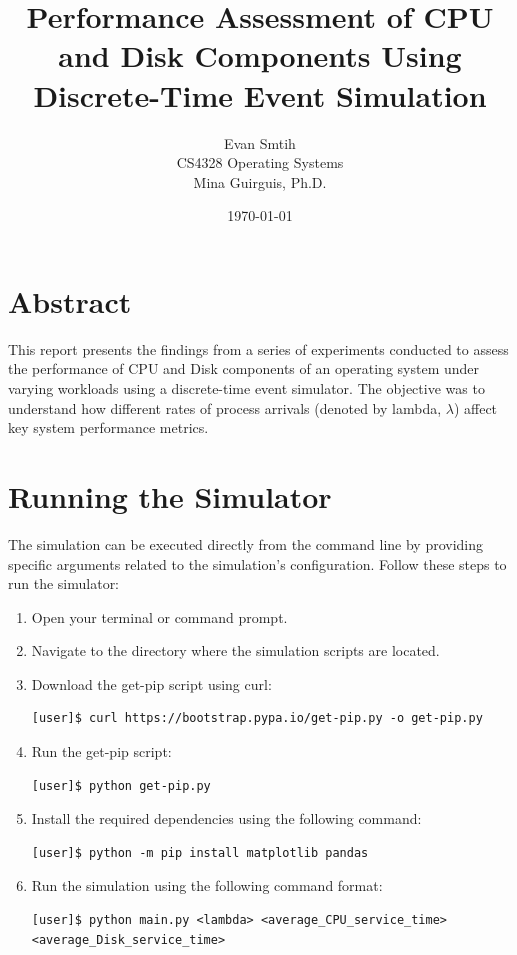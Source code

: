 \documentclass[12pt]{article}
\title{Performance Assessment of CPU and Disk Components Using Discrete-Time Event Simulation}
\author{Evan Smtih\\
        CS4328 Operating Systems\\
        Mina Guirguis, Ph.D.\\}
\date{\today}
\begin{document}
\maketitle

\section{Abstract}
This report presents the findings from a series of experiments conducted to assess the performance of CPU and Disk components of an operating system under varying workloads using a discrete-time event simulator. The objective was to understand how different rates of process arrivals (denoted by lambda, $\lambda$) affect key system performance metrics.

\section{Running the Simulator}
The simulation can be executed directly from the command line by providing specific arguments related to the simulation's configuration. Follow these steps to run the simulator:

\begin{enumerate}
    \small\item Open your terminal or command prompt.
    \small\item Navigate to the directory where the simulation scripts are located.
    \small\item Download the get-pip script using curl:
    \begin{verbatim}
[user]$ curl https://bootstrap.pypa.io/get-pip.py -o get-pip.py
    \end{verbatim}
    \small\item Run the get-pip script:
    \begin{verbatim}
[user]$ python get-pip.py
    \end{verbatim}
    \small\item Install the required dependencies using the following command:
    \begin{verbatim}
[user]$ python -m pip install matplotlib pandas
    \end{verbatim}
    \small\item Run the simulation using the following command format:
    \begin{verbatim}
[user]$ python main.py <lambda> <average_CPU_service_time> <average_Disk_service_time>
    \end{verbatim}
\end{enumerate}
\end{document}
